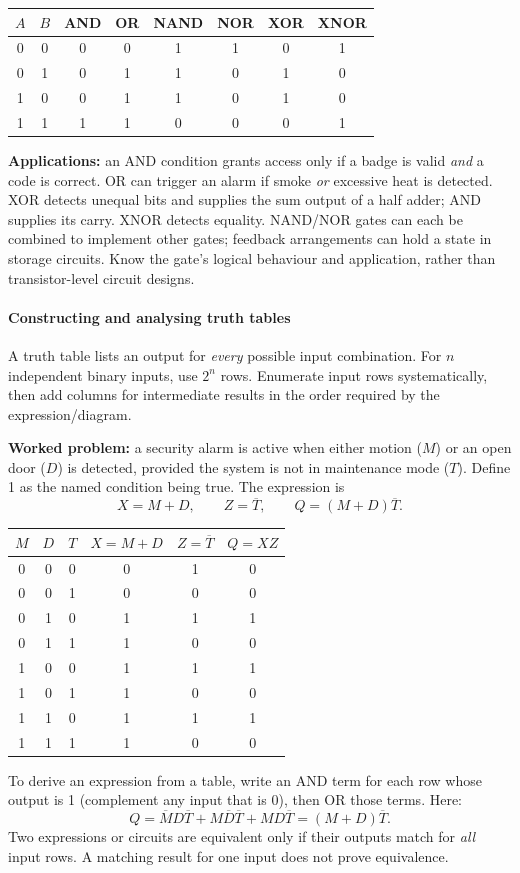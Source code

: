 \documentclass[a4paper,12pt]{article}
\begin{document}
\begin{center}
\begin{tabular}{c c|c c c c c c}
\toprule
$A$ & $B$ & AND & OR & NAND & NOR & XOR & XNOR \\
\midrule
0 & 0 & 0 & 0 & 1 & 1 & 0 & 1 \\
0 & 1 & 0 & 1 & 1 & 0 & 1 & 0 \\
1 & 0 & 0 & 1 & 1 & 0 & 1 & 0 \\
1 & 1 & 1 & 1 & 0 & 0 & 0 & 1 \\
\bottomrule
\end{tabular}
\end{center}
\textbf{Applications:} an AND condition grants access only if a badge is valid \emph{and} a code is correct. OR can trigger an alarm if smoke \emph{or} excessive heat is detected. XOR detects unequal bits and supplies the sum output of a half adder; AND supplies its carry. XNOR detects equality. NAND/NOR gates can each be combined to implement other gates; feedback arrangements can hold a state in storage circuits. Know the gate's logical behaviour and application, rather than transistor-level circuit designs.

\paragraph{Constructing and analysing truth tables}
A truth table lists an output for \emph{every} possible input combination. For $n$ independent binary inputs, use $2^n$ rows. Enumerate input rows systematically, then add columns for intermediate results in the order required by the expression/diagram.

\textbf{Worked problem:} a security alarm is active when either motion ($M$) or an open door ($D$) is detected, provided the system is not in maintenance mode ($T$). Define 1 as the named condition being true. The expression is
\[
X=M+D,\qquad Z=\overline{T},\qquad Q=(M+D)\overline{T}.
\]
\begin{center}
\begin{tabular}{c c c|c c|c}
\toprule
$M$ & $D$ & $T$ & $X=M+D$ & $Z=\overline{T}$ & $Q=XZ$ \\
\midrule
0 & 0 & 0 & 0 & 1 & 0 \\
0 & 0 & 1 & 0 & 0 & 0 \\
0 & 1 & 0 & 1 & 1 & 1 \\
0 & 1 & 1 & 1 & 0 & 0 \\
1 & 0 & 0 & 1 & 1 & 1 \\
1 & 0 & 1 & 1 & 0 & 0 \\
1 & 1 & 0 & 1 & 1 & 1 \\
1 & 1 & 1 & 1 & 0 & 0 \\
\bottomrule
\end{tabular}
\end{center}
To derive an expression from a table, write an AND term for each row whose output is 1 (complement any input that is 0), then OR those terms. Here:
\[
Q=\overline{M}D\overline{T}+M\overline{D}\overline{T}+MD\overline{T}=(M+D)\overline{T}.
\]
Two expressions or circuits are equivalent only if their outputs match for \emph{all} input rows. A matching result for one input does not prove equivalence.
\end{document}
